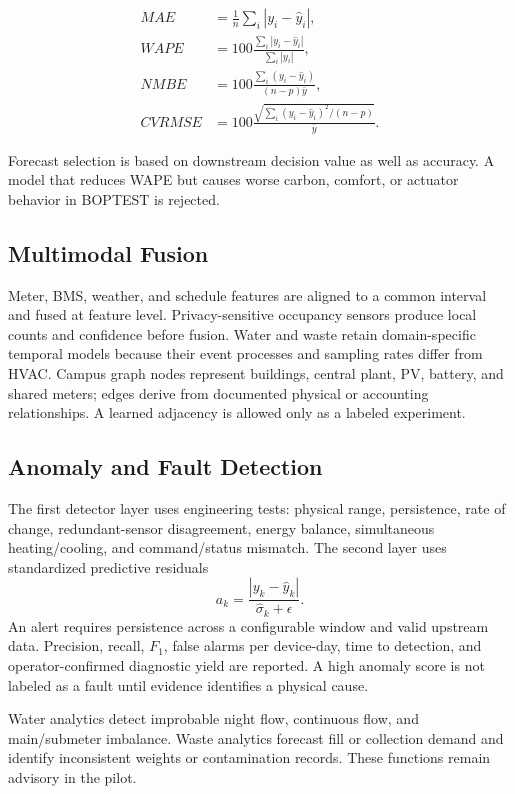 \begin{align}
	MAE    & = \frac{1}{n}\sum_i|y_i-\hat y_i|,                      \\
	WAPE   & = 100\frac{\sum_i|y_i-\hat y_i|}{\sum_i|y_i|},          \\
	NMBE   & =100\frac{\sum_i(y_i-\hat y_i)}{(n-p)\bar y},           \\
	CVRMSE & =100\frac{\sqrt{\sum_i(y_i-\hat y_i)^2/(n-p)}}{\bar y}.
\end{align}

Forecast selection is based on downstream decision value as well as accuracy. A model that reduces WAPE but causes worse carbon, comfort, or actuator behavior in BOPTEST is rejected.

\subsection{Multimodal Fusion}

Meter, BMS, weather, and schedule features are aligned to a common interval and fused at feature level. Privacy-sensitive occupancy sensors produce local counts and confidence before fusion. Water and waste retain domain-specific temporal models because their event processes and sampling rates differ from HVAC. Campus graph nodes represent buildings, central plant, PV, battery, and shared meters; edges derive from documented physical or accounting relationships. A learned adjacency is allowed only as a labeled experiment.

\subsection{Anomaly and Fault Detection}

The first detector layer uses engineering tests: physical range, persistence, rate of change, redundant-sensor disagreement, energy balance, simultaneous heating/cooling, and command/status mismatch. The second layer uses standardized predictive residuals
\begin{equation}
	a_k=\frac{|y_k-\hat y_k|}{\hat\sigma_k+\epsilon}.
	\label{eq:anomaly-score}
\end{equation}
An alert requires persistence across a configurable window and valid upstream data. Precision, recall, $F_1$, false alarms per device-day, time to detection, and operator-confirmed diagnostic yield are reported. A high anomaly score is not labeled as a fault until evidence identifies a physical cause.

Water analytics detect improbable night flow, continuous flow, and main/submeter imbalance. Waste analytics forecast fill or collection demand and identify inconsistent weights or contamination records. These functions remain advisory in the pilot.

